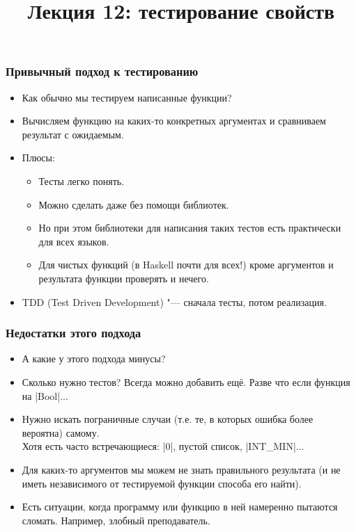 \documentclass[11pt]{beamer}
\title{Лекция 12: тестирование свойств}
\begin{document}
\begin{frame}[plain]
  \maketitle
\end{frame}

\begin{frame}[fragile]
  \frametitle{Привычный подход к тестированию}
  \begin{itemize}
    \item Как обычно мы тестируем написанные функции?
          \pause
    \item Вычисляем функцию на каких-то конкретных аргументах и сравниваем результат с ожидаемым.
    \item Плюсы:
          \pause
          \begin{itemize}
            \item Тесты легко понять.
            \item Можно сделать даже без помощи библиотек.
            \item Но при этом библиотеки для написания таких тестов есть практически для всех языков.
            \item Для чистых функций (в Haskell почти для всех!) кроме аргументов и результата функции проверять и нечего.
          \end{itemize}
          \pause
    \item TDD (Test Driven Development) \pause "--- сначала тесты, потом реализация.
  \end{itemize}
\end{frame}

\begin{frame}[fragile]
  \frametitle{Недостатки этого подхода}
  \begin{itemize}
    \item А какие у этого подхода минусы?
          \pause
    \item Сколько нужно тестов? Всегда можно добавить ещё.
          \pause
          Разве что если функция на \haskinline|Bool|...
          \pause
    \item Нужно искать пограничные случаи (т.е. те, в которых ошибка более вероятна) самому. \\
          Хотя есть часто встречающиеся: \pause \haskinline|0|, пустой список, \haskinline|INT_MIN|...
          \pause
    \item Для каких-то аргументов мы можем не знать правильного результата (и не иметь независимого от тестируемой функции способа его найти).
          \pause
    \item Есть ситуации, когда программу или функцию в ней намеренно пытаются сломать. \pause Например, злобный преподаватель.
  \end{itemize}
\end{frame}
\end{document}

